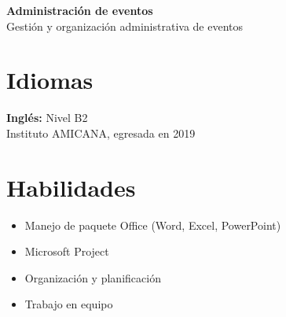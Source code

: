 \documentclass[11pt,a4paper]{article}
\begin{document}
\vspace{0.3cm}

\textbf{Administración de eventos} \\
Gestión y organización administrativa de eventos

\section*{Idiomas}
\textbf{Inglés:} Nivel B2 \\
Instituto AMICANA, egresada en 2019

\section*{Habilidades}
\begin{itemize}[leftmargin=*]
    \item Manejo de paquete Office (Word, Excel, PowerPoint)
    \item Microsoft Project
    \item Organización y planificación
    \item Trabajo en equipo
\end{itemize}
\end{document}

